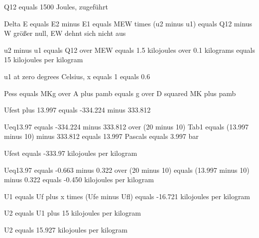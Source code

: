 Q12 equals 1500 Joules, zugeführt

Delta E equals E2 minus E1 equals MEW times (u2 minus u1) equals Q12 minus W größer null, EW dehnt sich nicht aus

u2 minus u1 equals Q12 over MEW equals 1.5 kilojoules over 0.1 kilograms equals 15 kilojoules per kilogram

u1 at zero degrees Celsius, x equals 1 equals 0.6

Pess equals MKg over A plus pamb equals g over D squared MK plus pamb

Ufest plus 13.997 equals -334.224 minus 333.812

Ueq13.97 equals -334.224 minus 333.812 over (20 minus 10) Tab1 equals (13.997 minus 10) minus 333.812 equals 13.997 Pascals equals 3.997 bar

Ufest equals -333.97 kilojoules per kilogram

Ueq13.97 equals -0.663 minus 0.322 over (20 minus 10) equals (13.997 minus 10) minus 0.322 equals -0.450 kilojoules per kilogram

U1 equals Uf plus x times (Ufe minus Ufl) equals -16.721 kilojoules per kilogram

U2 equals U1 plus 15 kilojoules per kilogram

U2 equals 15.927 kilojoules per kilogram